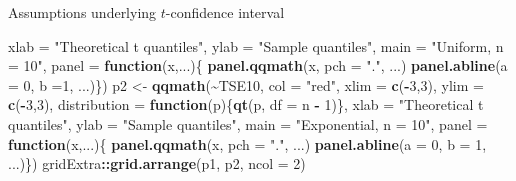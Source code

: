 \documentclass[
  ignorenonframetext,
]{beamer}
\newenvironment{Shaded}{\begin{snugshade}}{\end{snugshade}}
\newcommand{\AttributeTok}[1]{\textcolor[rgb]{0.13,0.29,0.53}{#1}}
\newcommand{\ControlFlowTok}[1]{\textcolor[rgb]{0.13,0.29,0.53}{\textbf{#1}}}
\newcommand{\DecValTok}[1]{\textcolor[rgb]{0.00,0.00,0.81}{#1}}
\newcommand{\FunctionTok}[1]{\textcolor[rgb]{0.13,0.29,0.53}{\textbf{#1}}}
\newcommand{\NormalTok}[1]{#1}
\newcommand{\OtherTok}[1]{\textcolor[rgb]{0.56,0.35,0.01}{#1}}
\newcommand{\SpecialCharTok}[1]{\textcolor[rgb]{0.81,0.36,0.00}{\textbf{#1}}}
\newcommand{\StringTok}[1]{\textcolor[rgb]{0.31,0.60,0.02}{#1}}
\begin{document}
\begin{frame}[fragile]{Assumptions underlying \(t\)-confidence interval}
\begin{Shaded}
\begin{Highlighting}[]
       \AttributeTok{xlab =} \StringTok{"Theoretical t quantiles"}\NormalTok{, }\AttributeTok{ylab =} \StringTok{"Sample quantiles"}\NormalTok{, }\AttributeTok{main =} \StringTok{"Uniform, n = 10"}\NormalTok{, }
       \AttributeTok{panel =} \ControlFlowTok{function}\NormalTok{(x,...)\{}
  \FunctionTok{panel.qqmath}\NormalTok{(x, }\AttributeTok{pch =} \StringTok{"."}\NormalTok{, ...)}
  \FunctionTok{panel.abline}\NormalTok{(}\AttributeTok{a =} \DecValTok{0}\NormalTok{, }\AttributeTok{b =}\DecValTok{1}\NormalTok{, ...)\})}
\NormalTok{p2 }\OtherTok{\textless{}{-}} \FunctionTok{qqmath}\NormalTok{(}\SpecialCharTok{\textasciitilde{}}\NormalTok{TSE10, }\AttributeTok{col =} \StringTok{"red"}\NormalTok{, }\AttributeTok{xlim =} \FunctionTok{c}\NormalTok{(}\SpecialCharTok{{-}}\DecValTok{3}\NormalTok{,}\DecValTok{3}\NormalTok{), }\AttributeTok{ylim =} \FunctionTok{c}\NormalTok{(}\SpecialCharTok{{-}}\DecValTok{3}\NormalTok{,}\DecValTok{3}\NormalTok{), }\AttributeTok{distribution =} \ControlFlowTok{function}\NormalTok{(p)\{}\FunctionTok{qt}\NormalTok{(p, }\AttributeTok{df =}\NormalTok{ n }\SpecialCharTok{{-}} \DecValTok{1}\NormalTok{)\}, }
       \AttributeTok{xlab =} \StringTok{"Theoretical t quantiles"}\NormalTok{, }\AttributeTok{ylab =} \StringTok{"Sample quantiles"}\NormalTok{, }\AttributeTok{main =} \StringTok{"Exponential, n = 10"}\NormalTok{, }
       \AttributeTok{panel =} \ControlFlowTok{function}\NormalTok{(x,...)\{}
  \FunctionTok{panel.qqmath}\NormalTok{(x, }\AttributeTok{pch =} \StringTok{"."}\NormalTok{, ...)}
  \FunctionTok{panel.abline}\NormalTok{(}\AttributeTok{a =} \DecValTok{0}\NormalTok{, }\AttributeTok{b =} \DecValTok{1}\NormalTok{, ...)\})}
\NormalTok{gridExtra}\SpecialCharTok{::}\FunctionTok{grid.arrange}\NormalTok{(p1, p2, }\AttributeTok{ncol =} \DecValTok{2}\NormalTok{)}
\end{Highlighting}
\end{Shaded}

\normalsize
\end{frame}
\end{document}
